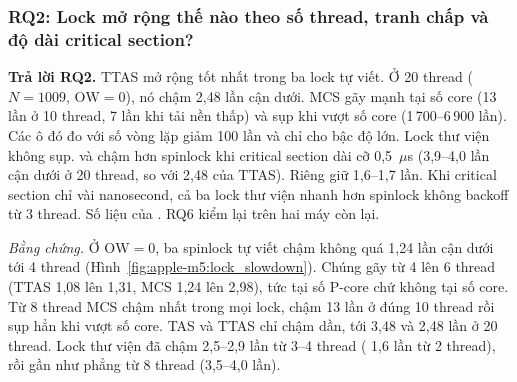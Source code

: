\subsubsection{RQ2: Lock mở rộng thế nào theo số thread, tranh chấp và độ dài critical section?}

\begin{rqanswer}\textbf{Trả lời RQ2.} TTAS mở rộng tốt nhất trong ba lock tự viết. Ở 20 thread
($N = 1009$, $\mathrm{OW} = 0$), nó chậm 2,48 lần cận dưới. MCS gãy mạnh tại số core (13 lần ở 10
thread, 7 lần khi tải nền thấp) và sụp khi vượt số core (1\,700--6\,900 lần). Các ô đó đo với số vòng lặp giảm 100 lần và chỉ cho bậc độ
lớn. Lock thư viện không sụp.  và  chậm hơn spinlock khi
critical section dài cỡ 0,5~$\mu$s (3,9--4,0 lần cận dưới ở 20 thread, so với 2,48 của TTAS). Riêng
 giữ 1,6--1,7 lần. Khi critical section chỉ vài nanosecond, cả ba lock thư viện
nhanh hơn spinlock không backoff từ 3 thread. Số liệu của . RQ6 kiểm lại trên hai máy còn lại.\end{rqanswer}


\emph{Bằng chứng.} Ở $\mathrm{OW} = 0$, ba spinlock tự viết chậm không quá 1,24 lần cận dưới tới 4
thread (Hình~\ref{fig:apple-m5:lock_slowdown}). Chúng gãy từ 4 lên 6 thread (TTAS 1,08 lên 1,31, MCS
1,24 lên 2,98), tức tại số P-core chứ không tại số core. Từ 8 thread MCS chậm nhất trong mọi lock, chậm
13 lần ở đúng 10 thread rồi sụp hẳn khi vượt số core. TAS và TTAS chỉ chậm dần, tới 3,48 và 2,48 lần ở
20 thread. Lock thư viện đã chậm 2,5--2,9 lần từ 3--4 thread ( 1,6 lần từ 2
thread), rồi gần như phẳng từ 8 thread (3,5--4,0 lần).

